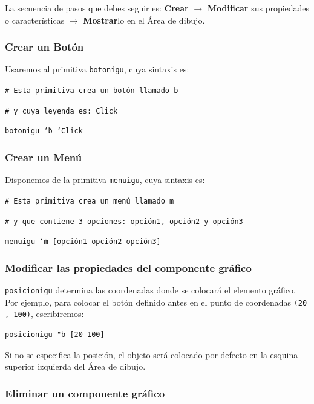 La secuencia de pasos que debes seguir es: \textbf{Crear}  $\rightarrow$ 
\textbf{Modificar} sus propiedades o caracter\'isticas  $\rightarrow$  \textbf{Mostrar}lo
en el \'Area de dibujo.

\subsubsection{Crear un Bot\'on}

Usaremos al primitiva \texttt{botonigu}, cuya
sintaxis es: 

\noindent \texttt{\# Esta primitiva crea un bot\'on llamado b}

\noindent \texttt{\# y cuya leyenda es: Click}

\noindent \texttt{botonigu \char`\"{}b \char`\"{}Click}

\subsubsection{Crear un Men\'u}

Disponemos de la primitiva \texttt{menuigu}, 
cuya sintaxis es:

\noindent \texttt{\# Esta primitiva crea un men\'u llamado m}

\noindent \texttt{\# y que contiene 3 opciones: opci\'on1, opci\'on2 y opci\'on3}

\noindent \texttt{menuigu \char`\"{}m [opci\'on1 opci\'on2 opci\'on3]}

\subsubsection{Modificar las propiedades del componente gr\'afico}

\texttt{posicionigu} 
determina las coordenadas donde se colocar\'a el elemento gr\'afico.
Por ejemplo, para colocar el bot\'on definido antes en el punto de coordenadas 
\texttt{(20 , 100)}, escribiremos:
\begin{verbatim}
posicionigu "b [20 100] \end{verbatim}

Si no se especifica la posici\'on, el objeto ser\'a colocado por defecto en la
esquina superior izquierda del \'Area de dibujo.

\subsubsection{Eliminar un componente gr\'afico}

